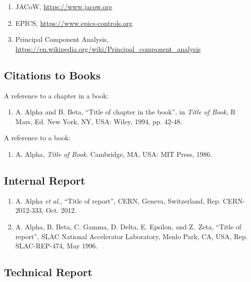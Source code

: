 \documentclass[%
               hyphens,       %
               ]{jacow}
\begin{document}
\begin{enumerate}[leftmargin=22pt, resume*]
	\item JACoW, \url{https://www.jacow.org}

	\item EPICS, \url{https://www.epics-controls.org}

	\item Principal Component Analysis, \\ 
		\url{https://en.wikipedia.org/wiki/Principal_component_analysis}
\end{enumerate}

\subsection{Citations to Books}
A reference to a chapter in a book:
\begin{enumerate}[leftmargin=22pt, resume*]
	\item A. Alpha and B. Beta, 
		“Title of chapter in the book”, in \textit{Title of Book}, 
		R Mars, Ed. New York, NY, USA: Wiley, 1994, pp. 42-48.
\end{enumerate}

A reference to a book:
\begin{enumerate}[leftmargin=22pt, resume*]
	\item A. Alpha, \textit{Title of Book}. 
		Cambridge, MA, USA: MIT Press, 1986.
\end{enumerate}

\subsection{Internal Report}

\begin{enumerate}[leftmargin=22pt, resume*]
	\item A. Alpha \textit{et al.}, “Title of report”, CERN, Geneva, Switzerland, 
		Rep. CERN-2012-333, Oct. 2012.

	\item A. Alpha, B. Beta, C. Gamma, D. Delta, E. Epsilon, and Z.~Zeta, 
		“Title of report”, SLAC National Accelerator Laboratory, Menlo Park, CA, USA, Rep. SLAC-REP-474, May 1996.
\end{enumerate}

\flushcolsend
\subsection{Technical Report}
\end{document}

